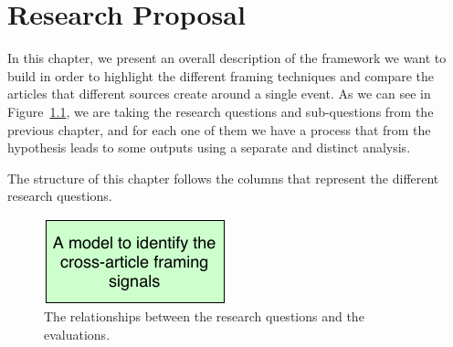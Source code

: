 \chapter{Research Proposal}
\label{chap:proposal}





In this chapter, we present an overall description of the framework we want to build in order to highlight the different framing techniques and compare the articles that different sources create around a single event.
As we can see in Figure~\ref{fig:diagram}, we are taking the research questions and sub-questions from the previous chapter, and for each one of them we have a process that from the hypothesis leads to some outputs using a separate and distinct analysis.

The structure of this chapter follows the columns that represent the different research questions.

\begin{figure}[!htb]
    \centering
    \includegraphics[width=\linewidth]{figures/diagram-RQ.pdf}
    \caption{The relationships between the research questions and the evaluations.}
    \label{fig:diagram}
\end{figure}

